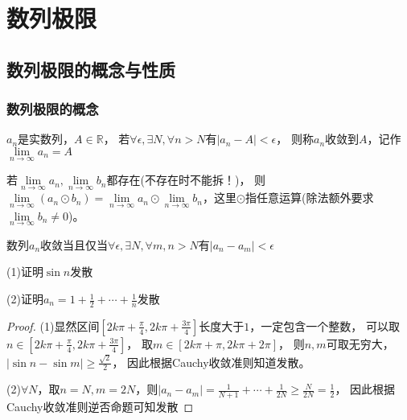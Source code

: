 



\chapter{数列极限}

\section{数列极限的概念与性质}

\subsection{数列极限的概念}

\begin{definition}[数列极限]
  $a_n$是实数列，$A \in \mathbb{R}$，
  若$\forall \epsilon, \exists N, \forall n > N$有$|a_n - A| < \epsilon$，
  则称$a_n$收敛到$A$，记作$\lim \limits _{n \rightarrow \infty}  a_n = A$
\end{definition}

\begin{theorem}[极限的四则运算]
  若$\lim \limits _{n \rightarrow \infty} a_n, \lim \limits _{n \rightarrow \infty} b_n$都存在(不存在时不能拆！)，
  则$\lim \limits _{n \rightarrow \infty} (a_n \odot b_n) = \lim \limits _{n \rightarrow \infty} a_n \odot \lim \limits _{n \rightarrow \infty} b_n$，这里$\odot$指任意运算(除法额外要求$\lim \limits _{n \rightarrow \infty} b_n \neq 0$)。
\end{theorem}

\begin{theorem}[cauchy收敛准则]
  数列$a_n$收敛当且仅当$\forall \epsilon, \exists N, \forall m,n > N$有$|a_n - a_m| < \epsilon$
\end{theorem}

\begin{exercise}[几个经典极限]
  (1)证明$\sin n$发散

  (2)证明$a_n = 1 + \frac{1}{2} + \cdots + \frac{1}{n}$发散
\end{exercise}

\begin{proof}
  (1)显然区间$[2k\pi + \frac{\pi}{4}, 2k\pi + \frac{3\pi}{4}]$长度大于$1$，一定包含一个整数，
  可以取$n \in [2k\pi + \frac{\pi}{4}, 2k\pi + \frac{3\pi}{4}]$，
  取$m \in [2k\pi + \pi, 2k\pi + 2\pi]$，
  则$n,m$可取无穷大，
  $|\sin n - \sin m| \geq \frac{\sqrt{2}}{2}$，
  因此根据Cauchy收敛准则知道发散。

  (2)$\forall N$，取$n = N, m = 2N$，则$|a_n - a_m| = \frac{1}{N+1} + \cdots + \frac{1}{2N} \geq \frac{N}{2N} = \frac{1}{2}$，
  因此根据Cauchy收敛准则逆否命题可知发散
\end{proof}

